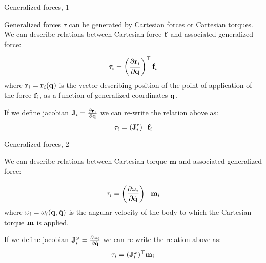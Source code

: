 \documentclass{beamer}
\begin{document}
\begin{frame}{Generalized forces, 1}
	\begin{flushleft}
		
		Generalized forces $\tau$ can be generated by Cartesian forces or Cartesian torques. We can describe relations between Cartesian force $\mathbf{f}$ and associated generalized force:
		
		\begin{equation}
			\tau_i = \left( \frac{\partial \mathbf{r}_i}{\partial  \mathbf{q}} \right)^\top \mathbf{f}_i
		\end{equation}
		where $\mathbf{r}_i = \mathbf{r}_i(\mathbf{q})$ is the vector describing position of the point of application of the force $\mathbf{f}_i$, as a function of generalized coordinates $\mathbf{q}$.
		
		\bigskip
		
		If we define jacobian $\mathbf{J}_i = \frac{\partial \mathbf{r}_i}{\partial  \mathbf{q}}$ we can re-write the relation above as:
		\begin{equation}
			\tau_i = (\mathbf{J}^r_i)^\top \mathbf{f}_i
		\end{equation}
	
	\end{flushleft}
\end{frame}


\begin{frame}{Generalized forces, 2}
	\begin{flushleft}
		
		We can describe relations between Cartesian torque $\mathbf{m}$ and associated generalized force:
		
		\begin{equation}
			\tau_i = \left( \frac{\partial \omega_i}{\partial  \dot{\mathbf{q}}} \right)^\top \mathbf{m}_i
		\end{equation}
		where $\omega_i = \omega_i(\mathbf{q}, \dot{\mathbf{q}})$ is the angular velocity of the body to which the Cartesian torque $\mathbf{m}$  is applied.
		
		\bigskip
		
		If we define jacobian $\mathbf{J}^\omega_i = \frac{\partial \omega_i}{\partial  \dot{\mathbf{q}}}$ we can re-write the relation above as:
		\begin{equation}
			\tau_i = (\mathbf{J}^\omega_i)^\top \mathbf{m}_i
		\end{equation}
		
	\end{flushleft}
\end{frame}
\end{document}
